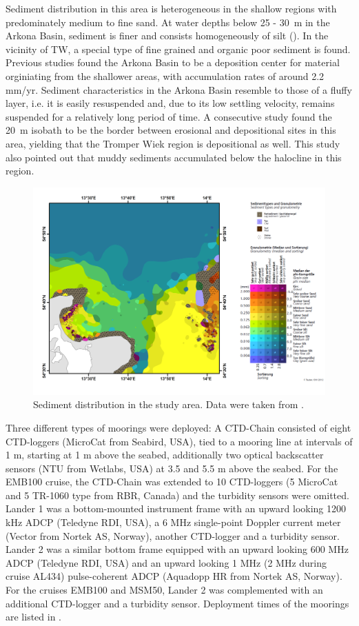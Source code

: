  Sediment distribution in this area is heterogeneous in the shallow regions 
with predominately medium to fine sand. At water depths below 25 - 30~m in the 
Arkona Basin, sediment is finer and consists homogeneously of silt 
(). In the vicinity of TW, a special type of fine grained and 
organic poor sediment is found. Previous studies \citep[][]{leipe2000, 
basys1} found the Arkona Basin to be a deposition center for material 
orginiating from the shallower areas, with accumulation rates of around 2.2 
mm/yr. Sediment characteristics in the Arkona Basin resemble to those of a 
fluffy layer, i.e. it is easily resuspended and, due to its low settling 
velocity, remains suspended for a relatively long period of time. A consecutive 
study \citep[][]{basys2} found the 20~m isobath to be the border between 
erosional and depositional sites in this area, yielding that the Tromper Wiek 
region is depositional as well. This study also pointed out that muddy 
sediments accumulated below the halocline in this region.
 \begin{figure}[ht]
\includegraphics[width=40pc]{bilder/TW.pdf}
 \caption{Sediment distribution in the study area. Data were taken from 
\cite{tauber2012}.}
 \label{tauberkarte}
 \end{figure}

Three different types of moorings were deployed: A CTD-Chain consisted of eight 
CTD-loggers (MicroCat from Seabird, USA), tied to a mooring line at intervals 
of 1 m, starting at 1 m above the seabed, additionally two optical 
backscatter sensors (NTU from Wetlabs, USA) at 3.5 and 5.5 m above the seabed. 
For the EMB100 cruise, the CTD-Chain was extended to 10 CTD-loggers (5 MicroCat 
and 5 TR-1060 type from RBR, Canada) and the turbidity sensors were omitted. 
Lander 1 was a bottom-mounted instrument frame with an upward looking 1200 kHz 
ADCP (Teledyne RDI, USA), a 6 MHz single-point Doppler current meter (Vector 
from Nortek AS, Norway), another CTD-logger and a turbidity sensor. Lander 2 
was a similar bottom frame equipped with an upward looking 600 MHz ADCP 
(Teledyne RDI, USA) and an upward looking 1 MHz (2 MHz during cruise AL434) 
pulse-coherent ADCP (Aquadopp HR from Nortek AS, Norway). For the cruises 
EMB100 and MSM50, Lander 2 was complemented with an additional CTD-logger and a 
turbidity sensor. Deployment times of the moorings are listed in 
.

